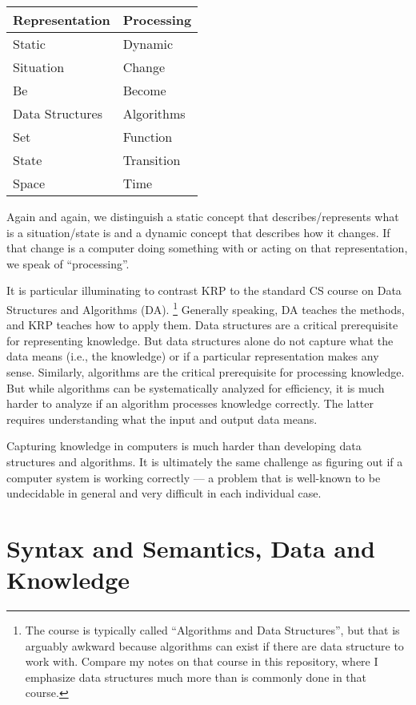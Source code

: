 \begin{center}
\begin{tabular}{l|l}
Representation & Processing \\
\hline
Static & Dynamic \\
Situation & Change \\
Be & Become \\
Data Structures & Algorithms \\
Set & Function \\
State & Transition \\
Space & Time
\end{tabular}
\end{center}

Again and again, we distinguish a static concept that describes/represents what is a situation/state is and a dynamic concept that describes how it changes.
If that change is a computer doing something with or acting on that representation, we speak of ``processing''.

It is particular illuminating to contrast KRP to the standard CS course on Data Structures and Algorithms (DA).%
\footnote{The course is typically called ``Algorithms and Data Structures'', but that is arguably awkward because algorithms can exist if there are data structure to work with. Compare my notes on that course in this repository, where I emphasize data structures much more than is commonly done in that course.}
Generally speaking, DA teaches the methods, and KRP teaches how to apply them.
Data structures are a critical prerequisite for representing knowledge.
But data structures alone do not capture what the data means (i.e., the knowledge) or if a particular representation makes any sense.
Similarly, algorithms are the critical prerequisite for processing knowledge.
But while algorithms can be systematically analyzed for efficiency, it is much harder to analyze if an algorithm processes knowledge correctly.
The latter requires understanding what the input and output data means.

Capturing knowledge in computers is much harder than developing data structures and algorithms.
It is ultimately the same challenge as figuring out if a computer system is working correctly --- a problem that is well-known to be undecidable in general and very difficult in each individual case.

\section{Syntax and Semantics, Data and Knowledge}

